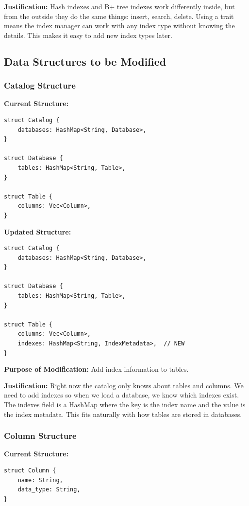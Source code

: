 \documentclass[11pt,a4paper]{article}
\begin{document}
\textbf{Justification:} Hash indexes and B+ tree indexes work differently inside, but from the outside they do the same things: insert, search, delete. Using a trait means the index manager can work with any index type without knowing the details. This makes it easy to add new index types later.

\subsection{Data Structures to be Modified}

\subsubsection{Catalog Structure}

\textbf{Current Structure:}
\begin{lstlisting}
struct Catalog {
    databases: HashMap<String, Database>,
}

struct Database {
    tables: HashMap<String, Table>,
}

struct Table {
    columns: Vec<Column>,
}
\end{lstlisting}

\textbf{Updated Structure:}
\begin{lstlisting}
struct Catalog {
    databases: HashMap<String, Database>,
}

struct Database {
    tables: HashMap<String, Table>,
}

struct Table {
    columns: Vec<Column>,
    indexes: HashMap<String, IndexMetadata>,  // NEW
}
\end{lstlisting}

\textbf{Purpose of Modification:} Add index information to tables.

\textbf{Justification:} Right now the catalog only knows about tables and columns. We need to add indexes so when we load a database, we know which indexes exist. The indexes field is a HashMap where the key is the index name and the value is the index metadata. This fits naturally with how tables are stored in databases.

\subsubsection{Column Structure}

\textbf{Current Structure:}
\begin{lstlisting}
struct Column {
    name: String,
    data_type: String,
}
\end{lstlisting}
\end{document}
